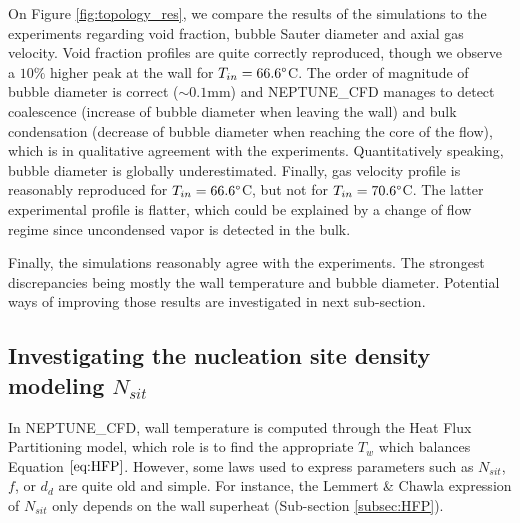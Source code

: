 On Figure \ref{fig:topology_res}, we compare the results of the simulations to the experiments regarding void fraction, bubble Sauter diameter and axial gas velocity. Void fraction profiles are quite correctly reproduced, though we observe a $10\%$ higher peak at the wall for $T_{in}=66.6\degree$C. The order of magnitude of bubble diameter is correct ($\sim 0.1\text{mm}$) and NEPTUNE\_CFD manages to detect coalescence (increase of bubble diameter when leaving the wall) and bulk condensation (decrease of bubble diameter when reaching the core of the flow), which is in qualitative agreement with the experiments. Quantitatively speaking, bubble diameter is globally underestimated. Finally, gas velocity profile is reasonably reproduced for $T_{in}=66.6\degree$C, but not for $T_{in}=70.6\degree$C. The latter experimental profile is flatter, which could be explained by a change of flow regime since uncondensed vapor is detected in the bulk.  

Finally, the simulations reasonably agree with the experiments. The strongest discrepancies being mostly the wall temperature and bubble diameter. Potential ways of improving those results are investigated in next sub-section.

\subsection{Investigating the nucleation site density modeling $N_{sit}$}

In NEPTUNE\_CFD, wall temperature is computed through the Heat Flux Partitioning model, which role is to find the appropriate $T_{w}$ which balances Equation $\ref{eq:HFP}$. However, some laws used to express parameters such as $N_{sit}$, $f$, or $d_{d}$ are quite old and simple. For instance, the {Lemmert} \& {Chawla}\cite{lemmert_influence_1977} expression of $N_{sit}$ only depends on the wall superheat (Sub-section \ref{subsec:HFP}).%

